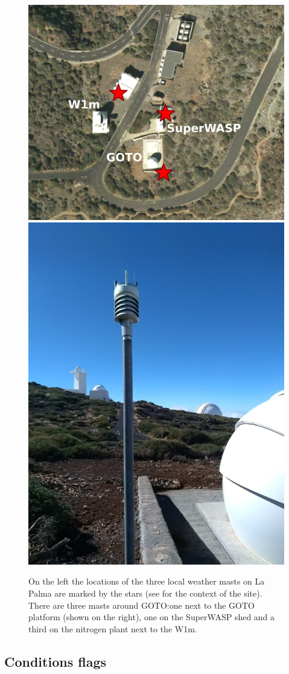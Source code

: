 \begin{colsection}
\begin{colsection}
\begin{figure}[t]
    \begin{center}
        \includegraphics[height=0.5\textwidth]{images/orm_warwick.pdf}
        \includegraphics[height=0.5\textwidth]{images/conditions_photo.jpg}
    \end{center}
    \caption[Locations of the three weather masts on La Palma]{
        On the left the locations of the three local weather masts on La Palma are marked by the  stars (see  for the context of the site). There are three masts around GOTO:\@ one next to the GOTO platform (shown on the right), one on the SuperWASP shed and a third on the nitrogen plant next to the W1m.
    }\label{fig:conditions}
\end{figure}

\end{colsection}

\newpage

\subsection{Conditions flags}
\label{sec:conditions_flags}
\begin{colsection}


\end{colsection}
\end{colsection}
